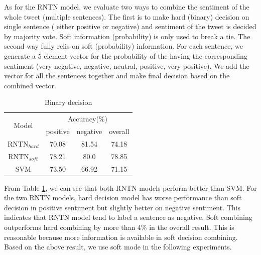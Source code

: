 As for the RNTN model, we evaluate two ways to combine the sentiment of the whole tweet (multiple sentences). The first is to make hard (binary) decision on single sentence ( either positive or negative) and sentiment of the tweet is decided by majority vote. Soft information (probability) is only used to break a tie. The second way fully relis on soft (probability) information. For each sentence, we generate a 5-element vector for the probability of the having the corresponding sentiment (very negative, negative, neutral, positive, very positive). We add the vector for all the sentences together and make final decision based on the combined vector. 
\begin{table}[H]
  \begin{center}
    \begin{tabular}{cccc}\hline
      \multirow{2}{*}{Model} 
      & \multicolumn{3}{c}{Accuracy(\%)} \\\cline{2-4}
    & positive & negative & overall \\ \hline
    RNTN$_{hard}$  & 70.08 	    &  81.54       &  74.18     \\
    RNTN$_{soft}$  & 78.21     &   80.0	    &   78.85    \\ 
    SVM           & 73.50     &   66.92     &   71.15      \\\hline 
    \end{tabular}
    \end{center}
    \caption{\label{exp2_1} Binary decision}
\end{table}

From Table \ref{exp2_1}, we can see that both RNTN models perform better than SVM. For the two RNTN models, 
 hard decision model has worse performance than soft decision in positive sentiment but slightly better on negative sentiment. This indicates that RNTN model tend to label a sentence as negative. Soft combining outperforms hard combining by more than 4\% in the overall result. This is reasonable because more information is available in soft decision combining. Based on the above result, we use soft mode in the following experiments. 


